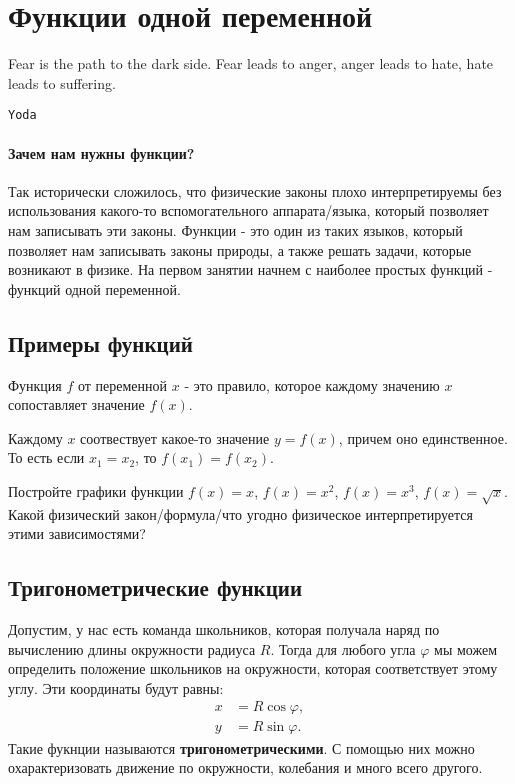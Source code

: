 \section{Функции одной переменной}
\epigraph{\textsf{Fear is the path to the dark side. Fear leads to anger, anger leads to hate, hate leads to suffering.}}{\texttt{Yoda}}
\paragraph{Зачем нам нужны функции?} Так исторически сложилось, что физические законы плохо интерпретируемы без использования какого-то вспомогательного аппарата/языка, который 
позволяет нам записывать эти законы. Функции - это один из таких языков, который позволяет нам записывать законы природы, а также решать задачи, которые возникают в физике. На первом занятии начнем с наиболее простых функций - функций одной переменной.
\subsection{Примеры функций}
\begin{definition}
    Функция $f$ от переменной $x$ - это правило, которое каждому значению $x$ сопоставляет значение $f(x)$.
\end{definition}
Каждому $x$ соотвествует какое-то значение $y = f(x)$, причем оно единственное. То есть если $x_1 = x_2$, то $f(x_1) = f(x_2)$.

\begin{prac}
   Постройте графики функции $f(x) = x$, $f(x) = x^2$, $f(x) = x^3$, $f(x) = \sqrt{x}$. Какой физический закон/формула/что угодно физическое интерпретируется этими зависимостями? 
\end{prac}
\subsection{Тригонометрические функции}
Допустим, у нас есть команда школьников, которая получала наряд по вычислению длины окружности радиуса $R$. Тогда для любого угла $\varphi$ мы можем определить положение школьников на окружности, которая соответствует этому углу. Эти координаты будут равны:
\begin{align*}
    x &= R \cos \varphi, \\
    y &= R \sin \varphi.
\end{align*}
Такие фукнции называются \textbf{тригонометрическими}. С помощью них можно охарактеризовать движение по окружности, колебания и много всего другого.

